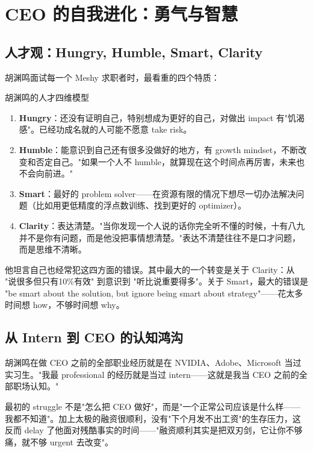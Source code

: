 \section{CEO 的自我进化：勇气与智慧}

\subsection{人才观：Hungry, Humble, Smart, Clarity}

胡渊鸣面试每一个 Meshy 求职者时，最看重的四个特质：

\begin{importantbox}{胡渊鸣的人才四维模型}
\begin{enumerate}
\item \textbf{Hungry}：还没有证明自己，特别想成为更好的自己，对做出 impact 有"饥渴感"。已经功成名就的人可能不愿意 take risk。
\item \textbf{Humble}：能意识到自己还有很多没做好的地方，有 growth mindset，不断改变和否定自己。"如果一个人不 humble，就算现在这个时间点再厉害，未来也不会向前进。"
\item \textbf{Smart}：最好的 problem solver——在资源有限的情况下想尽一切办法解决问题（比如用更低精度的浮点数训练、找到更好的 optimizer）。
\item \textbf{Clarity}：表达清楚。"当你发现一个人说的话你完全听不懂的时候，十有八九并不是你有问题，而是他没把事情想清楚。"表达不清楚往往不是口才问题，而是思维不清晰。
\end{enumerate}
\end{importantbox}

他坦言自己也经常犯这四方面的错误。其中最大的一个转变是关于 Clarity：从 "说很多但只有10\%有效" 到意识到 "听比说重要得多"。关于 Smart，最大的错误是 "be smart about the solution, but ignore being smart about strategy"——花太多时间想 how，不够时间想 why。

\subsection{从 Intern 到 CEO 的认知鸿沟}

胡渊鸣在做 CEO 之前的全部职业经历就是在 NVIDIA、Adobe、Microsoft 当过实习生。"我最 professional 的经历就是当过 intern——这就是我当 CEO 之前的全部职场认知。"

最初的 struggle 不是"怎么把 CEO 做好"，而是"一个正常公司应该是什么样——我都不知道"。加上太极的融资很顺利，没有"下个月发不出工资"的生存压力，这反而 delay 了他面对残酷事实的时间——"融资顺利其实是把双刃剑，它让你不够痛，就不够 urgent 去改变"。

